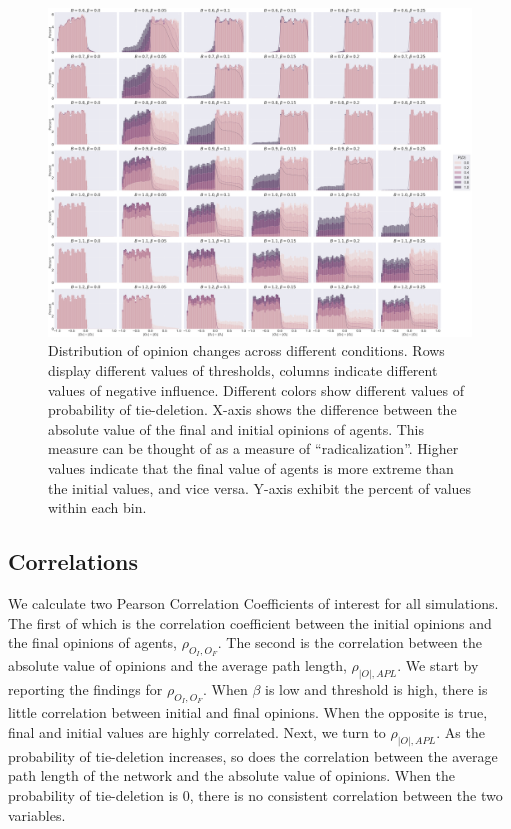 \documentclass{article}
\begin{document}
\begin{figure}[H]
    \centering
    \includegraphics[width=.8\linewidth]{../plots/overall/Radicalization.png}
  \caption{Distribution of opinion changes across different conditions. Rows display different values of thresholds, columns indicate different values of negative influence. Different colors show different values of probability of tie-deletion. X-axis shows the difference between the absolute value of the final and initial opinions of agents. This measure can be thought of as a measure of “radicalization”. Higher values indicate that the final value of agents is more extreme than the initial values, and vice versa. Y-axis exhibit the percent of values within each bin. }
  \label{fig:sfig1}
\end{figure}

\subsection{Correlations}

We calculate two Pearson Correlation Coefficients of interest for all simulations. The first of which is the correlation coefficient between the initial opinions and the final opinions of agents, $\rho_{O_I, O_F}$. The second is the correlation between the absolute value of opinions and the average path length, $\rho_{|O|, APL}$.
We start by reporting the findings for $\rho_{O_I, O_F}$. When $\beta$ is low and threshold is high, there is little correlation between initial and final opinions. When the opposite is true, final and initial values are highly correlated. 
Next, we turn to $\rho_{|O|, APL}$. As the probability of tie-deletion increases, so does the correlation between the average path length of the network and the absolute value of opinions. When the probability of tie-deletion is 0, there is no consistent correlation between the two variables. 
\end{document}
